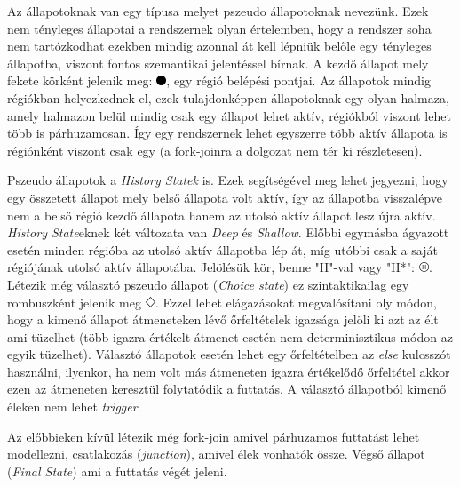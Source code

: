 Az állapotoknak van egy típusa melyet pszeudo állapotoknak nevezünk. Ezek nem tényleges állapotai a rendszernek olyan értelemben, hogy a rendszer soha nem tartózkodhat ezekben mindig azonnal át kell lépniük belőle egy tényleges állapotba, viszont fontos szemantikai jelentéssel bírnak. A kezdő állapot mely fekete körként jelenik meg: \includegraphics[width=3mm, height=3mm]{figures/preliminaries/icons/initial.png}, egy régió belépési pontjai. Az állapotok mindig régiókban helyezkednek el, ezek tulajdonképpen állapotoknak egy olyan halmaza, amely halmazon belül mindig csak egy állapot lehet aktív, régiókból viszont lehet több is párhuzamosan. Így egy rendszernek lehet egyszerre több aktív állapota is régiónként viszont csak egy (a fork-joinra a dolgozat nem tér ki részletesen).

Pszeudo állapotok a \emph{History Statek} is. Ezek segítségével meg lehet jegyezni, hogy egy összetett állapot mely belső állapota volt aktív, így az állapotba visszalépve nem a belső régió kezdő állapota hanem az utolsó aktív állapot lesz újra aktív. \emph{History State}eknek két változata van \emph{Deep} és \emph{Shallow}. Előbbi egymásba ágyazott esetén minden régióba az utolsó aktív állapotba lép át, míg utóbbi csak a saját régiójának utolsó aktív állapotába. Jelölésük kör, benne "H"-val vagy "H*": \includegraphics[width=3mm, height=3mm]{figures/preliminaries/icons/history.png}. Létezik még választó pszeudo állapot (\emph{Choice state}) ez szintaktikailag egy rombuszként jelenik meg \includegraphics[width=3mm, height=3mm]{figures/preliminaries/icons/choice.png}. Ezzel lehet elágazásokat megvalósítani oly módon, hogy a kimenő állapot átmeneteken lévő őrfeltételek igazsága jelöli ki azt az élt ami tüzelhet (több igazra értékelt átmenet esetén nem determinisztikus módon az egyik tüzelhet). Választó állapotok esetén lehet egy őrfeltételben az \emph{else} kulcsszót használni, ilyenkor, ha nem volt más átmeneten igazra értékelődő őrfeltétel akkor ezen az átmeneten keresztül folytatódik a futtatás. A választó állapotból kimenő éleken nem lehet \emph{trigger}.

Az előbbieken kívül létezik még fork-join amivel párhuzamos futtatást lehet modellezni, csatlakozás (\emph{junction}), amivel élek vonhatók össze. Végső állapot (\emph{Final State}) ami a futtatás végét jeleni.



